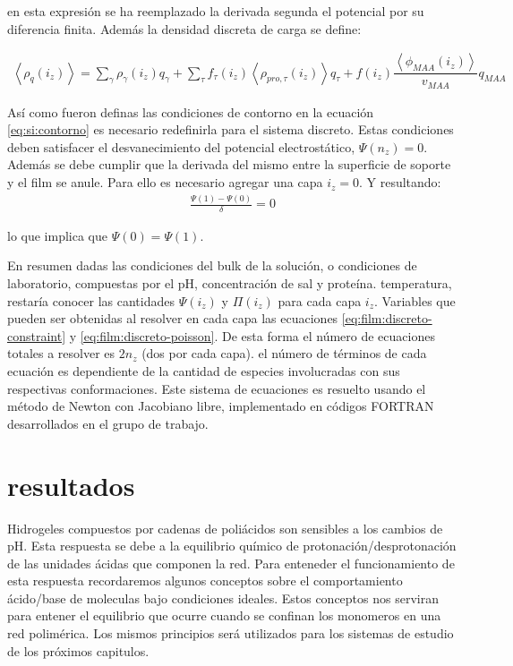 \noindent en esta expresi\'on se ha reemplazado la derivada segunda el potencial por su diferencia finita. Adem\'as la densidad discreta de carga se define:


\begin{align}
	\left<\rho_q(i_z)\right> = \sum_{\gamma } {\rho_\gamma(i_z) q_\gamma + \sum_\tau{f_\tau(i_z) \left<\rho_{pro,\tau}(i_z)\right> q_\tau} +  f(i_z)\dfrac{\left<\phi_{MAA}(i_z)\right>}{v_{MAA}}q_{MAA}}
	\label{eq:rho_charge}
\end{align}


As\'i como fueron definas las condiciones de contorno en la ecuaci\'on \ref{eq:si:contorno} es necesario redefinirla para el sistema discreto. Estas condiciones deben satisfacer el desvanecimiento del potencial electrost\'atico, $\Psi(n_z) =0 $. Adem\'as se debe cumplir que la derivada del mismo entre la superficie de soporte y el film se anule.
Para ello es necesario agregar una capa $i_z = 0$.
Y resultando:
\begin{align}
	\frac{\Psi(1) - \Psi(0)}{\delta} = 0
\end{align}

\noindent lo que implica que $\Psi(0) =  \Psi(1)$.

En resumen dadas las condiciones del bulk de la soluci\'on, o condiciones de laboratorio, compuestas por el pH, concentraci\'on de sal y prote\'ina. temperatura, restar\'ia conocer las cantidades $\Psi(i_z)$ y $\Pi(i_z)$ para cada capa $i_z$. Variables que pueden ser obtenidas al resolver en cada capa las ecuaciones \ref{eq:film:discreto-constraint} y \ref{eq:film:discreto-poisson}.
De esta forma el n\'umero de ecuaciones totales a resolver es $2n_z$ (dos por cada capa). el n\'umero de t\'erminos de cada ecuaci\'on es dependiente de la cantidad de especies involucradas con sus respectivas conformaciones. 
Este sistema de ecuaciones es resuelto usando el m\'etodo de Newton con Jacobiano libre, implementado en c\'odigos FORTRAN desarrollados en el grupo de trabajo.

\section{resultados}



Hidrogeles  compuestos por cadenas de poli\'acidos son sensibles a los cambios de pH. Esta respuesta se debe a la equilibrio qu\'imico de protonaci\'on/desprotonaci\'on de las unidades \'acidas que componen la red. 
Para enteneder el funcionamiento de esta respuesta recordaremos algunos conceptos sobre el comportamiento \'acido/base de moleculas bajo condiciones ideales. 
Estos conceptos nos serviran para entener el equilibrio que ocurre cuando se confinan los monomeros en una red polim\'erica. Los mismos principios ser\'a utilizados para los sistemas  de estudio de los pr\'oximos capitulos.

